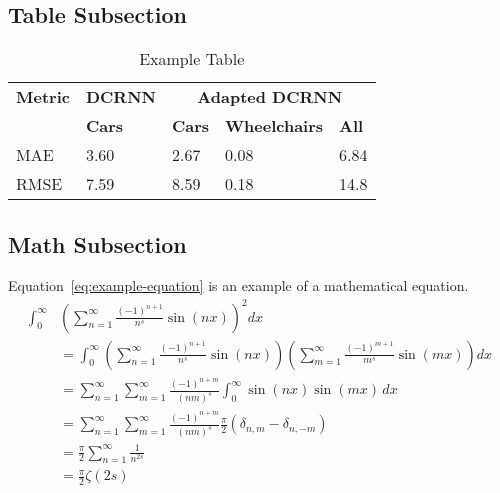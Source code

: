 \subsection{Table Subsection}\label{subsec:table-subsection}
\begin{table}[htbp]
    \caption{
        Example Table
    }
    \center
    \begin{tabular}{@{}lllll@{}}
        \toprule
        \textbf{Metric} & \textbf{DCRNN} & \multicolumn{3}{c}{\textbf{Adapted DCRNN}} \\
        & \textbf{Cars} & \textbf{Cars} & \textbf{Wheelchairs} & \textbf{All} \\
        \midrule
        MAE  & 3.60          & 2.67          & 0.08                 & 6.84         \\
        RMSE & 7.59          & 8.59          & 0.18                 & 14.8         \\
        \bottomrule
    \end{tabular}
    \label{tab:example-table}
\end{table}

\subsection{Math Subsection}\label{subsec:math-subsection}
Equation~\eqref{eq:example-equation} is an example of a mathematical equation.
\begin{equation}
    \begin{aligned}
        \int_{0}^{\infty} & \left( \sum_{n=1}^{\infty} \frac{(-1)^{n+1}}{n^s} \sin(nx) \right)^2 dx \\
        &= \int_{0}^{\infty} \left( \sum_{n=1}^{\infty} \frac{(-1)^{n+1}}{n^s} \sin(nx) \right)
        \left( \sum_{m=1}^{\infty} \frac{(-1)^{m+1}}{m^s} \sin(mx) \right) dx \\
        &= \sum_{n=1}^{\infty} \sum_{m=1}^{\infty} \frac{(-1)^{n+m}}{(nm)^s} \int_{0}^{\infty} \sin(nx) \sin(mx) \, dx \\
        &= \sum_{n=1}^{\infty} \sum_{m=1}^{\infty} \frac{(-1)^{n+m}}{(nm)^s}
        \frac{\pi}{2} (\delta_{n,m} - \delta_{n,-m}) \\
        &= \frac{\pi}{2} \sum_{n=1}^{\infty} \frac{1}{n^{2s}} \\
        &= \frac{\pi}{2} \zeta(2s)
    \end{aligned}
    \label{eq:example-equation}
\end{equation}

